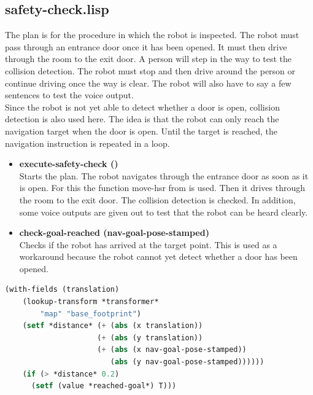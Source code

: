 \documentclass[main.tex]{subfiles}
\begin{document}
        \subsection{safety-check.lisp}
        The plan is for the procedure in which the robot is inspected. The robot must pass through an entrance door once it has been opened. It must then drive through the room to the exit door. A person will step in the way to test the collision detection.  The robot must stop and then drive around the person or continue driving once the way is clear. The robot will also have to say a few sentences to test the voice output. \\
            Since the robot is not yet able to detect whether a door is open, collision detection is also used here. The idea is that the robot can only reach the navigation target when the door is open. Until the target is reached, the navigation instruction is repeated in a loop.
        \begin{itemize}
            \item \textbf{execute-safety-check ()} \\
            Starts the plan. The robot navigates through the entrance door as soon as it is open. For this the function move-hsr from  is used. Then it drives through the room to the exit door. The collision detection is checked. In addition, some voice outputs are given out to test that the robot can be heard clearly.
            \item \textbf{check-goal-reached (nav-goal-pose-stamped)}\\
            Checks if the robot has arrived at the target point. This is used as a workaround because the robot cannot yet detect whether a door has been opened.
        \end{itemize}
            \begin{lstlisting}[language=lisp]
(with-fields (translation) 
	(lookup-transform *transformer* 
	    "map" "base_footprint")
	(setf *distance* (+ (abs (x translation))
	                 (+ (abs (y translation))
                     (+ (abs (x nav-goal-pose-stamped))
                        (abs (y nav-goal-pose-stamped))))))
	(if (> *distance* 0.2) 
      (setf (value *reached-goal*) T)))
          \end{lstlisting}
\end{document}
